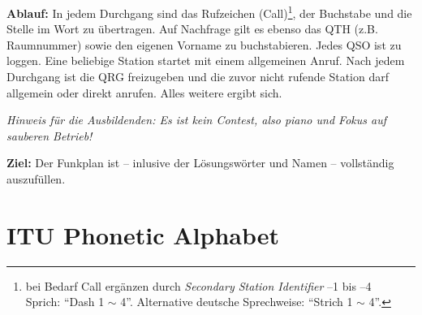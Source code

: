 \documentclass[a4paper,10pt]{article}
\begin{document}
\textbf{Ablauf:} In jedem Durchgang sind das Rufzeichen (Call)\footnote{bei
Bedarf Call ergänzen durch \emph{Secondary Station Identifier} --1 bis --4 \\
Sprich: ``Dash 1 $\sim$ 4''. Alternative deutsche Sprechweise: ``Strich 1 $\sim$
4''.}, der Buchstabe und die Stelle im Wort zu übertragen. Auf Nachfrage gilt es
ebenso das QTH (z.B.  Raumnummer) sowie den eigenen Vorname zu buchstabieren.
Jedes QSO ist zu loggen.  Eine beliebige Station startet mit einem allgemeinen
Anruf. Nach jedem Durchgang ist die QRG freizugeben und die zuvor nicht rufende
Station darf allgemein oder direkt anrufen. Alles weitere ergibt sich.


\begin{center}
  \textit{Hinweis für die Ausbildenden: Es ist kein Contest, also piano und
  Fokus auf sauberen Betrieb!}
\end{center}

\textbf{Ziel:} Der Funkplan ist -- inlusive der Lösungswörter und Namen --
vollständig auszufüllen.

\section{ITU Phonetic Alphabet}
\end{document}
